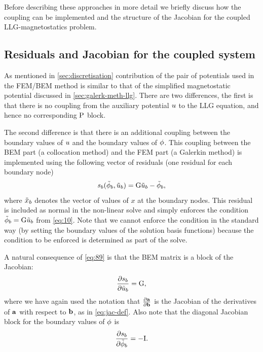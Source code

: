 Before describing these approaches in more detail we briefly discuss how the coupling can be implemented and the structure of the Jacobian for the coupled LLG-magnetostatics problem.

\subsection{Residuals and Jacobian for the coupled system}
\label{sec:bem-jacobian-structure}

As mentioned in \cref{sec:discretisation} contribution of the pair of potentials used in the FEM/BEM method is similar to that of the simplified magnetostatic potential discussed in \cref{sec:galerk-meth-llg}.
There are two differences, the first is that there is no coupling from the auxiliary potential $u$ to the LLG equation, and hence no corresponding $\mathrm{P}$ block.

The second difference is that there is an additional coupling between the boundary values of $u$ and the boundary values of $\phi$.
This coupling between the BEM part (a collocation method) and the FEM part (a Galerkin method) is implemented using the following vector of residuals (one residual for each boundary node)
\newcommand{\rphimb}{\rphi_b}
\begin{equation}
  \rphimb(\phimdis_b, \phionedis_b) = \bm \phionedis_b - \phimdis_b,
  \label{eq:89}
\end{equation}
where $\tilde{x}_b$ denotes the vector of values of $x$ at the boundary nodes.
This residual is included as normal in the non-linear solve and simply enforces the condition $\tilde{\phi}_b = {\mathbf{\mathrm{G}}} \tilde{u}_b$ from \cref{eq:10}.
Note that we cannot enforce the condition in the standard way (by setting the boundary values of the solution basis functions) because the condition to be enforced is determined as part of the solve.

A natural consequence of \cref{eq:89} is that the BEM matrix is a block of the Jacobian:
\begin{equation}
  \pd{\rphimb}{\phionedis_b} = \bm,
\end{equation}
where we have again used the notation that $\frac{\partial {\boldsymbol{\mathrm{a}}}}{\partial {\boldsymbol{\mathrm{b}}}}$ is the Jacobian of the derivatives of ${\boldsymbol{\mathrm{a}}}$ with respect to ${\boldsymbol{\mathrm{b}}}$, as in \cref{eq:jac-def}.
Also note that the diagonal Jacobian block for the boundary values of $\phi$ is
\begin{equation}
  \pd{\rphimb}{\phimdis_b} = -\Idm.
\end{equation}

